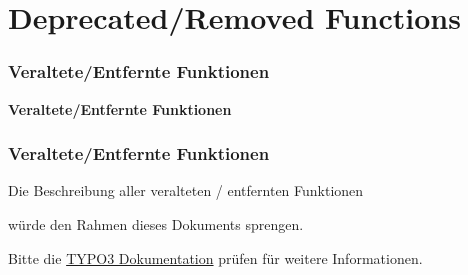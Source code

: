%

\section{Deprecated/Removed Functions}
\begin{frame}[fragile]
	\frametitle{Veraltete/Entfernte Funktionen}

	\begin{center}\huge{\color{typo3darkgrey}\textbf{Veraltete/Entfernte Funktionen}}\end{center}
	\begin{center}\large{\textit{}}\end{center}

\end{frame}


\begin{frame}[fragile]
	\frametitle{Veraltete/Entfernte Funktionen}

	\vspace{1cm}
	\begin{center}
		Die Beschreibung aller veralteten / entfernten Funktionen
	\end{center}
	\vspace{-0.8cm}
	\begin{center}
		 würde den Rahmen dieses Dokuments sprengen.
	\end{center}
	\vspace{-0.6cm}
	\begin{center}
		Bitte die \href{https://docs.typo3.org/typo3cms/extensions/core/latest/Changelog-9.html}{TYPO3 Dokumentation} prüfen für weitere Informationen.
	\end{center}

\end{frame}

